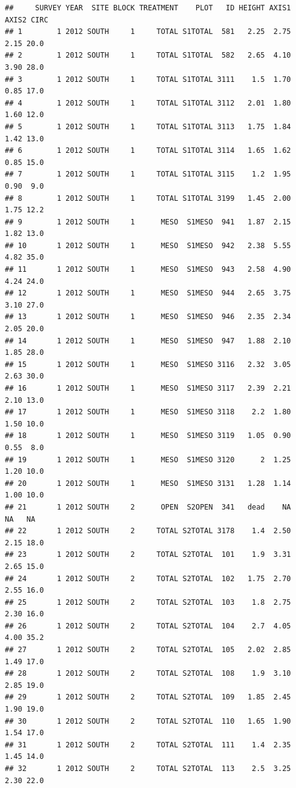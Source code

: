 \documentclass[
]{article}
\begin{document}
\begin{verbatim}
##     SURVEY YEAR  SITE BLOCK TREATMENT    PLOT   ID HEIGHT AXIS1 AXIS2 CIRC
## 1        1 2012 SOUTH     1     TOTAL S1TOTAL  581   2.25  2.75  2.15 20.0
## 2        1 2012 SOUTH     1     TOTAL S1TOTAL  582   2.65  4.10  3.90 28.0
## 3        1 2012 SOUTH     1     TOTAL S1TOTAL 3111    1.5  1.70  0.85 17.0
## 4        1 2012 SOUTH     1     TOTAL S1TOTAL 3112   2.01  1.80  1.60 12.0
## 5        1 2012 SOUTH     1     TOTAL S1TOTAL 3113   1.75  1.84  1.42 13.0
## 6        1 2012 SOUTH     1     TOTAL S1TOTAL 3114   1.65  1.62  0.85 15.0
## 7        1 2012 SOUTH     1     TOTAL S1TOTAL 3115    1.2  1.95  0.90  9.0
## 8        1 2012 SOUTH     1     TOTAL S1TOTAL 3199   1.45  2.00  1.75 12.2
## 9        1 2012 SOUTH     1      MESO  S1MESO  941   1.87  2.15  1.82 13.0
## 10       1 2012 SOUTH     1      MESO  S1MESO  942   2.38  5.55  4.82 35.0
## 11       1 2012 SOUTH     1      MESO  S1MESO  943   2.58  4.90  4.24 24.0
## 12       1 2012 SOUTH     1      MESO  S1MESO  944   2.65  3.75  3.10 27.0
## 13       1 2012 SOUTH     1      MESO  S1MESO  946   2.35  2.34  2.05 20.0
## 14       1 2012 SOUTH     1      MESO  S1MESO  947   1.88  2.10  1.85 28.0
## 15       1 2012 SOUTH     1      MESO  S1MESO 3116   2.32  3.05  2.63 30.0
## 16       1 2012 SOUTH     1      MESO  S1MESO 3117   2.39  2.21  2.10 13.0
## 17       1 2012 SOUTH     1      MESO  S1MESO 3118    2.2  1.80  1.50 10.0
## 18       1 2012 SOUTH     1      MESO  S1MESO 3119   1.05  0.90  0.55  8.0
## 19       1 2012 SOUTH     1      MESO  S1MESO 3120      2  1.25  1.20 10.0
## 20       1 2012 SOUTH     1      MESO  S1MESO 3131   1.28  1.14  1.00 10.0
## 21       1 2012 SOUTH     2      OPEN  S2OPEN  341   dead    NA    NA   NA
## 22       1 2012 SOUTH     2     TOTAL S2TOTAL 3178    1.4  2.50  2.15 18.0
## 23       1 2012 SOUTH     2     TOTAL S2TOTAL  101    1.9  3.31  2.65 15.0
## 24       1 2012 SOUTH     2     TOTAL S2TOTAL  102   1.75  2.70  2.55 16.0
## 25       1 2012 SOUTH     2     TOTAL S2TOTAL  103    1.8  2.75  2.30 16.0
## 26       1 2012 SOUTH     2     TOTAL S2TOTAL  104    2.7  4.05  4.00 35.2
## 27       1 2012 SOUTH     2     TOTAL S2TOTAL  105   2.02  2.85  1.49 17.0
## 28       1 2012 SOUTH     2     TOTAL S2TOTAL  108    1.9  3.10  2.85 19.0
## 29       1 2012 SOUTH     2     TOTAL S2TOTAL  109   1.85  2.45  1.90 19.0
## 30       1 2012 SOUTH     2     TOTAL S2TOTAL  110   1.65  1.90  1.54 17.0
## 31       1 2012 SOUTH     2     TOTAL S2TOTAL  111    1.4  2.35  1.45 14.0
## 32       1 2012 SOUTH     2     TOTAL S2TOTAL  113    2.5  3.25  2.30 22.0

\end{verbatim}
\end{document}
